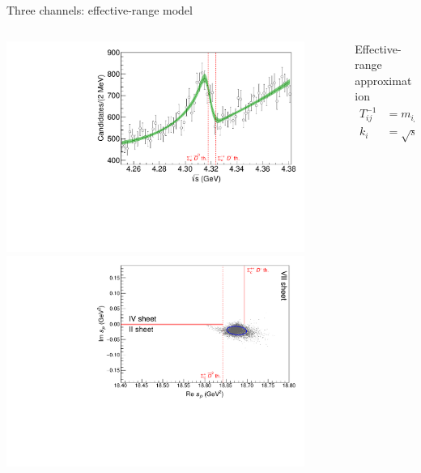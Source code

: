 \documentclass[aspectratio=169]{beamer}
\begin{document}
\begin{frame}[noframenumbering]{Three channels: effective-range model}%
\begin{columns}
    \begin{column}{0.4\textwidth}
        \begin{center}
            \includegraphics[width=0.9\textwidth]{figs/PcJPAC/plot_3nc.pdf}\\
            \includegraphics[width=0.9\textwidth]{figs/PcJPAC/general_3nc.pdf}
        \end{center}
    \end{column}
    \begin{column}{0.57\textwidth}
        \begin{block}{Effective-range approximation}
            \begin{align*}
                T^{-1}_{ij} &= m_{ij} + - i k_i \delta_{ij},\\
                k_i &= \sqrt{s-s_i}

\end{align*}
\end{block}
\end{column}
\end{columns}
\end{frame}
\end{document}
